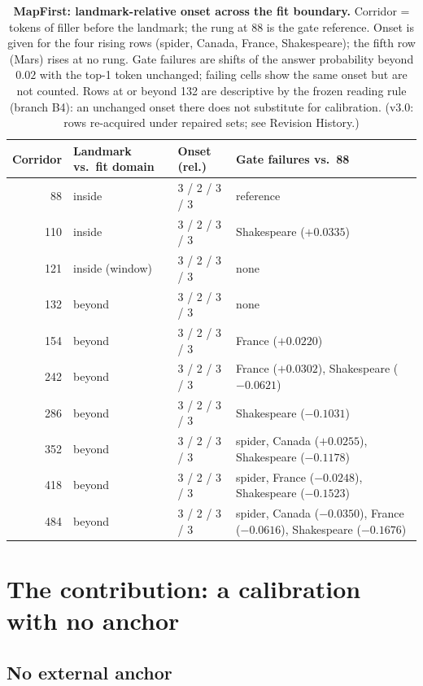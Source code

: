 \documentclass[11pt]{article}
\begin{document}
\begin{table}[t]\centering\small\caption{\textbf{MapFirst: landmark-relative onset across the fit boundary.} Corridor = tokens of filler before the landmark; the rung at 88 is the gate reference. Onset is given for the four rising rows (spider, Canada, France, Shakespeare); the fifth row (Mars) rises at no rung. Gate failures are shifts of the answer probability beyond $0.02$ with the top-1 token unchanged; failing cells show the same onset but are not counted. Rows at or beyond 132 are descriptive by the frozen reading rule (branch B4): an unchanged onset there does not substitute for calibration. (v3.0: rows re-acquired under repaired sets; see Revision History.)}\label{tab:mapfirst}

\begin{tabular}{@{}rp{2.3cm}p{2.1cm}p{7.6cm}@{}}\toprule Corridor & Landmark vs.\ fit domain & Onset (rel.) & Gate failures vs.\ 88 \\ \midrule 88 & inside & 3 / 2 / 3 / 3 & reference \\ 110 & inside & 3 / 2 / 3 / 3 & Shakespeare ($+0.0335$) \\ 121 & inside (window) & 3 / 2 / 3 / 3 & none \\ 132 & beyond & 3 / 2 / 3 / 3 & none \\ 154 & beyond & 3 / 2 / 3 / 3 & France ($+0.0220$) \\ 242 & beyond & 3 / 2 / 3 / 3 & France ($+0.0302$), Shakespeare ($-0.0621$) \\ 286 & beyond & 3 / 2 / 3 / 3 & Shakespeare ($-0.1031$) \\ 352 & beyond & 3 / 2 / 3 / 3 & spider, Canada ($+0.0255$), Shakespeare ($-0.1178$) \\ 418 & beyond & 3 / 2 / 3 / 3 & spider, France ($-0.0248$), Shakespeare ($-0.1523$) \\ 484 & beyond & 3 / 2 / 3 / 3 & spider, Canada ($-0.0350$), France ($-0.0616$), Shakespeare ($-0.1676$) \\ \bottomrule\end{tabular}\end{table}

\section{The contribution: a calibration with no anchor}
\label{sec:contribution}

\subsection{No external anchor}
\end{document}
